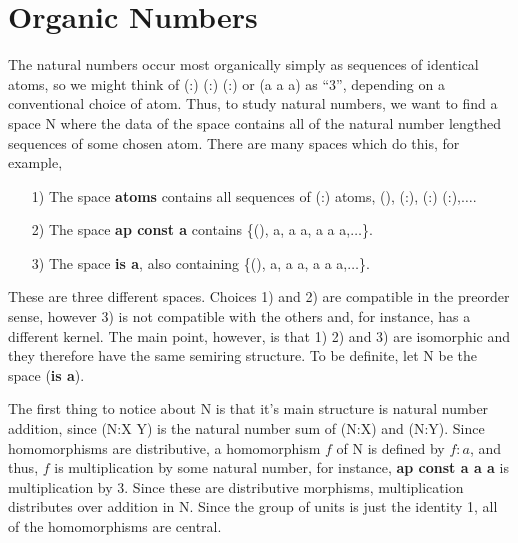 \documentclass[11pt]{article}
\begin{document}
\section{Organic Numbers}

      The natural numbers occur most organically simply as sequences of identical atoms, so we might think of (:) (:) (:) or (a a a) as ``3'', depending on a conventional choice of atom.  
Thus, to study natural numbers, we want to find a space N where the data of the space contains all of the natural number lengthed sequences of some chosen atom.  There are many 
spaces which do this, for example,  
\begin{itemize}
\item [1)] The space {\bf atoms} contains all sequences of (:) atoms, (), (:), (:) (:),$\dots$. 
\item [2)] The space {\bf ap const a} contains \{(), a, a a, a a a,$\dots$\}. 
\item [3)] The space {\bf is a}, also containing \{(), a, a a, a a a,$\dots$\}.
\end{itemize}
These are three different spaces.  Choices 1) and 2) are compatible in the preorder sense, however 3) is not compatible with the others and, for instance, has a different kernel.  The main point, however, is that 1) 2) and 3) are isomorphic and they therefore have the same semiring structure.  To be definite, let N be the space ({\bf is a}).  
      
     The first thing to notice about N is that it's main structure is natural number addition, since (N:X Y) is the natural number sum of (N:X) and (N:Y).  Since homomorphisms are distributive, a homomorphism $f$ of N is defined by $f:a$, and thus, $f$ is multiplication by some natural number, for instance, {\bf ap const a a a} is multiplication by 3.  Since these are distributive morphisms, multiplication distributes over addition in N.  Since the group of units is just the identity 1, all of the homomorphisms are central.  
     
\end{document}

